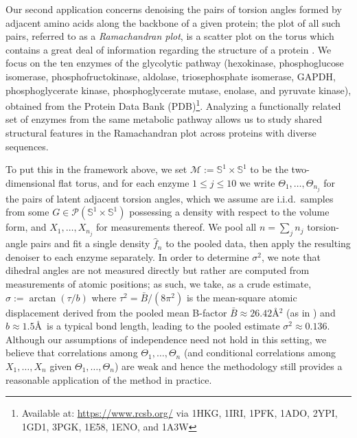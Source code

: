 \documentclass[preprint]{imsart}
\theoremstyle{plain}
\theoremstyle{definition}
\newcommand{\Pcal}{\mathcal{P}}
\newcommand{\Mcal}{\mathcal{M}}
\begin{document}
Our second application concerns denoising the pairs of torsion angles formed by adjacent amino acids along the backbone of a given protein; the plot of all such pairs, referred to as a \textit{Ramachandran plot}, is a scatter plot on the torus which contains a great deal of information regarding the structure of a protein \cite{Ramachandran,Hollingsworth,Pertsemlidis,Park}.
We focus on the ten enzymes of the glycolytic pathway (hexokinase, phosphoglucose isomerase, phosphofructokinase, aldolase, triosephosphate isomerase, GAPDH, phosphoglycerate kinase, phosphoglycerate mutase, enolase, and pyruvate kinase), obtained from the Protein Data Bank (PDB)\footnote{Available at: \url{https://www.rcsb.org/} via 1HKG, 1IRI, 1PFK, 1ADO, 2YPI, 1GD1, 3PGK, 1E58, 1ENO, and 1A3W}.
Analyzing a functionally related set of enzymes from the same metabolic pathway allows us to study shared structural features in the Ramachandran plot across proteins with diverse sequences.

To put this in the framework above, we set $\Mcal := \mathbb{S}^1\times \mathbb{S}^1$ to be the two-dimensional flat torus, and for each enzyme $1\le j\le 10$ we write $\Theta_1,\ldots, \Theta_{n_j}$ for the pairs of latent adjacent torsion angles, which we assume are i.i.d.~samples from some $G\in\Pcal(\mathbb{S}^1\times \mathbb{S}^1)$ possessing a density with respect to the volume form, and $X_1,\ldots, X_{n_j}$ for measurements thereof.
We pool all $n = \sum_j n_j$ torsion-angle pairs and fit a single density $\hat f_n$ to the pooled data, then apply the resulting denoiser to each enzyme separately.
In order to determine $\sigma^2$, we note that dihedral angles are not measured directly but rather are computed from measurements of atomic positions; as such, we take, as a crude estimate, $\sigma:=\arctan(\tau/b)$ where $\tau^2 = \bar{B}/(8\pi^2)$ is the mean-square atomic displacement derived from the pooled mean B-factor $\bar{B} \approx 26.42$\AA$^2$ (as in \cite{Rupp2009,Bfactors}) and $b \approx 1.5$\AA\ is a typical bond length, leading to the pooled estimate $\sigma^2 \approx 0.136$.
Although our assumptions of independence need not hold in this setting, we believe that correlations among $\Theta_1,\ldots, \Theta_n$ (and conditional correlations among $X_1,\ldots, X_n$ given $\Theta_1,\ldots, \Theta_n$) are weak and hence the methodology still provides a reasonable application of the method in practice.
\end{document}
